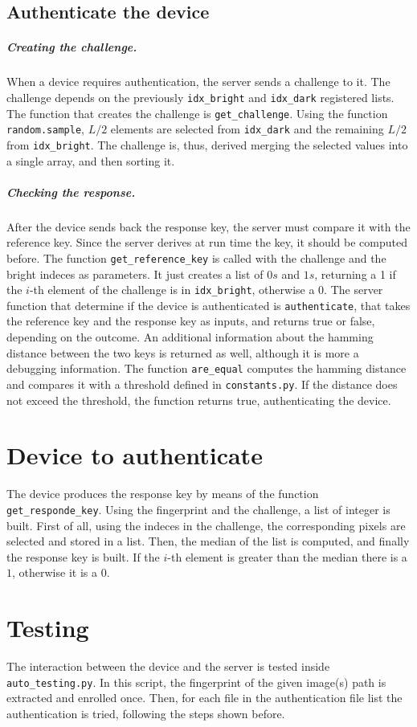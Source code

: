 \begin{enumerate}
        \subsection{Authenticate the device}\label{sec:authdevice}
        \subparagraph{Creating the challenge.}
        When a device requires authentication, the server sends a challenge to it. The challenge depends on the previously \texttt{idx\_bright} and \texttt{idx\_dark} registered lists.
        The function that creates the challenge is \texttt{get\_challenge}. Using the function \texttt{random.sample}, $L/2$ elements are selected from \texttt{idx\_dark} and the remaining $L/2$ from \texttt{idx\_bright}. The challenge is, thus, derived merging the selected values into a single array, and then sorting it.

        \subparagraph{Checking the response.}
        After the device sends back the response key, the server must compare it with the reference key. Since the server derives at run time the key, it should be computed before. The function \texttt{get\_reference\_key} is called with the challenge and the bright indeces as parameters. It just creates a list of $0s$ and $1s$, returning a 1 if the $i$-th element of the challenge is in \texttt{idx\_bright}, otherwise a 0.
        The server function that determine if the device is authenticated is \texttt{authenticate}, that takes the reference key and the response key as inputs, and returns true or false, depending on the outcome. An additional information about the hamming distance between the two keys is returned as well, although it is more a debugging information. The function \texttt{are\_equal} computes the hamming distance and compares it with a threshold defined in \texttt{constants.py}. If the distance does not exceed the threshold, the function returns true, authenticating the device.

        \section{Device to authenticate}\label{sec:device2authenticate}
        The device produces the response key by means of the function \texttt{get\_responde\_key}. Using the fingerprint and the challenge, a list of integer is built. First of all, using the indeces in the challenge, the corresponding pixels are selected and stored in a list. Then, the median of the list is computed, and finally the response key is built. If the $i$-th element is greater than the median there is a $1$, otherwise it is a $0$.

        \section{Testing}\label{sec:testing}
        The interaction between the device and the server is tested inside \texttt{auto\_testing.py}. In this script, the fingerprint of the given image(s) path is extracted and enrolled once. Then, for each file in the authentication file list the authentication is tried, following the steps shown before.
\end{enumerate}
